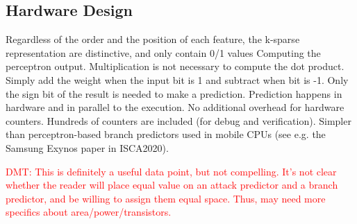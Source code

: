 \subsection{Hardware Design}
Regardless of the order
and the position of each feature, the k-sparse representation
are distinctive, and only contain 0/1 values
 Computing the perceptron output. Multiplication is not necessary to compute the dot product. Simply add the weight when the input bit is 1 and subtract when bit is -1. Only the sign bit of the result is needed to make a prediction. Prediction happens in hardware and in parallel to the execution.
No additional overhead for hardware counters. Hundreds of counters are included (for debug and verification). Simpler than perceptron-based branch predictors used in mobile CPUs (see e.g. the Samsung Exynos paper in ISCA2020).

\textcolor{red}{DMT: This is definitely a useful data point, but not compelling.  It's not clear 
whether the reader will place equal value on an attack predictor and a branch predictor, and be willing
to assign them equal space.  Thus, may need more specifics about area/power/transistors.}